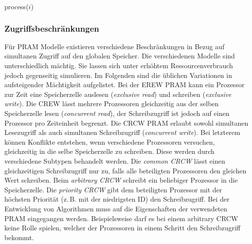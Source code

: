 \begin{algorithmic}
        \State process($i$)
    \EndParDo
\end{algorithmic}


\subsubsection{Zugriffsbeschränkungen}
Für PRAM Modelle existieren verschiedene Beschränkungen in Bezug auf simultanen
Zugriff auf den globalen Speicher.
Die verschiedenen Modelle sind unterschiedlich mächtig. Sie lassen sich unter
erhöhtem Ressourcenverbrauch jedoch gegenseitig simulieren.
Im Folgenden sind die üblichen Variationen in aufsteigender Mächtigkeit
aufgelistet.
Bei der EREW PRAM kann ein Prozessor zur Zeit eine Speicherzelle auslesen
(\emph{exclusive read}) und schreiben (\emph{exclusive write}).
Die CREW lässt mehrere Prozessoren gleichzeitig aus der selben Speicherzelle
lesen (\emph{concurrent read}), der Schreibzugriff ist jedoch auf einen
Prozessor pro Zeiteinheit begrenzt.
Die CRCW PRAM erlaubt sowohl simultanen Lesezugriff als auch simultanen
Schreibzugriff (\emph{concurrent write}).
Bei letzterem können Konflikte entstehen, wenn verschiedene Prozessoren
versuchen, gleichzeitig in die selbe Speicherzelle zu schreiben.
Diese werden durch verschiedene Subtypen behandelt werden.
Die \emph{common CRCW} lässt einen gleichzeitigen Schreibzugriff nur zu, falls
alle beteiligten Prozessoren den gleichen Wert schreiben.
Beim \emph{arbitrary CRCW} schreibt ein beliebiger Prozessor in die
Speicherzelle.
Die \emph{priority CRCW} gibt dem beteiligten Prozessor mit der höchsten
Priorität (z.\,B. mit der niedrigsten ID) den Schreibzugriff.
Bei der Entwicklung von Algorithmen muss auf die Eigenschaften der verwendeten
PRAM eingegangen werden.
Beispielsweise darf es bei einem arbitrary CRCW keine Rolle spielen, welcher der
Prozessoren in einem Schritt den Schreibzugriff bekommt.
\cite[S.14f.]{jaja}
